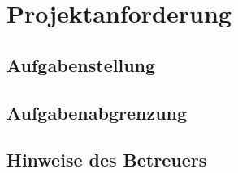 
\chapter{Projektanforderung}

	\section{Aufgabenstellung}
	
	\section{Aufgabenabgrenzung}
	
	\section{Hinweise des Betreuers}